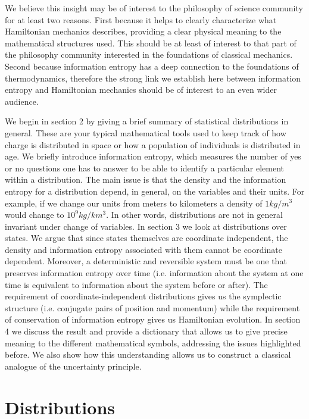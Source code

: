 \documentclass[11pt]{article}
\begin{document}
We believe this insight may be of interest to the philosophy of science community for at least two reasons. First because it helps to clearly characterize what Hamiltonian mechanics describes, providing a clear physical meaning to the mathematical structures used. This should be at least of interest to that part of the philosophy community interested in the foundations of classical mechanics. Second because information entropy has a deep connection to the foundations of thermodynamics, therefore the strong link we establish here between information entropy and Hamiltonian mechanics should be of interest to an even wider audience.

We begin in section 2 by giving a brief summary of statistical distributions in general. These are your typical mathematical tools used to keep track of how charge is distributed in space or how a population of individuals is distributed in age. We briefly introduce information entropy, which measures the number of yes or no questions one has to answer to be able to identify a particular element within a distribution. The main issue is that the density and the information entropy for a distribution depend, in general, on the variables and their units. For example, if we change our units from meters to kilometers a density of $1 kg/m^3$ would change to $10^9 kg/km^3$. In other words, distributions are not in general invariant under change of variables. In section 3 we look at distributions over states. We argue that since states themselves are coordinate independent, the density and information entropy associated with them cannot be coordinate dependent. Moreover, a deterministic and reversible system must be one that preserves information entropy over time (i.e. information about the system at one time is equivalent to information about the system before or after). The requirement of coordinate-independent distributions gives us the symplectic structure (i.e. conjugate pairs of position and momentum) while the requirement of conservation of information entropy gives us Hamiltonian evolution. In section 4 we discuss the result and provide a dictionary that allows us to give precise meaning to the different mathematical symbols, addressing the issues highlighted before. We also show how this understanding allows us to construct a classical analogue of the uncertainty principle.

\section{Distributions}
\end{document}

